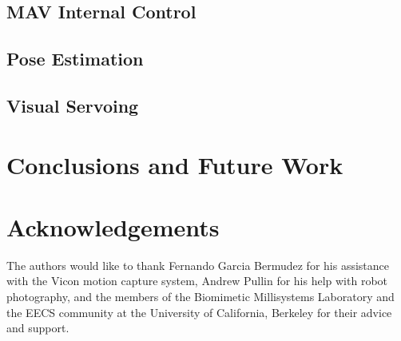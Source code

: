 \documentclass[letterpaper, 10 pt, conference]{ieeeconf}
\begin{document}
\subsection{MAV Internal Control}

\subsection{Pose Estimation}

\subsection{Visual Servoing}

\addtolength{\textheight}{-0cm}


\section{Conclusions and Future Work}

\section{Acknowledgements}
The authors would like to thank Fernando Garcia Bermudez for his assistance with the Vicon motion capture system, Andrew Pullin for his help with robot photography, and the members of the Biomimetic Millisystems Laboratory and the EECS community at the University of California, Berkeley for their advice and support.


\end{document}
